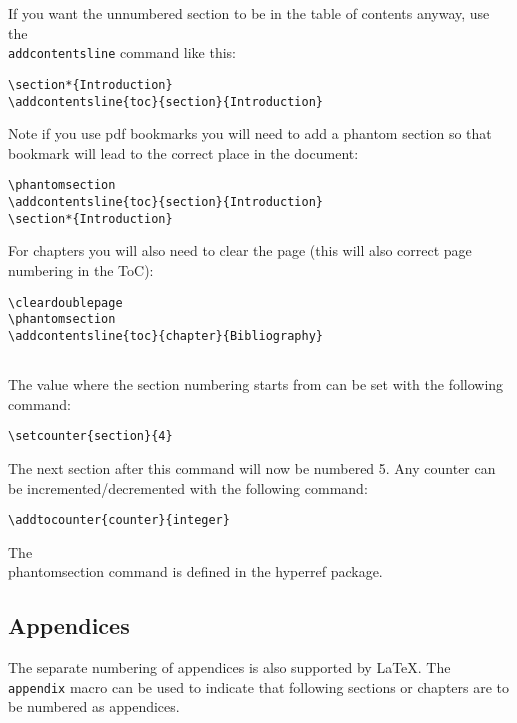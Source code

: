 If you want the unnumbered section to be in the table of contents anyway, use
the \texttt{\\addcontentsline} command like this:
\begin{lstlisting}
\section*{Introduction}
\addcontentsline{toc}{section}{Introduction}
\end{lstlisting}

Note if you use pdf bookmarks you will need to add a phantom section so that
bookmark will lead to the correct place in the document:
\begin{lstlisting}
\phantomsection
\addcontentsline{toc}{section}{Introduction}
\section*{Introduction} 
\end{lstlisting}

For chapters you will also need to clear the page (this will also correct page
numbering in the ToC):
\begin{lstlisting}
\cleardoublepage
\phantomsection
\addcontentsline{toc}{chapter}{Bibliography}


\end{lstlisting}

The value where the section numbering starts from can be set with the following
command:
\begin{lstlisting}
\setcounter{section}{4}
\end{lstlisting}

The next section after this command will now be numbered 5.  Any counter can be
incremented/decremented with the following command:
\begin{lstlisting}
\addtocounter{counter}{integer}
\end{lstlisting}

The \\phantomsection command is defined in the hyperref package.

\subsection{ Appendices }
The separate numbering of appendices is also supported by LaTeX. The
\texttt{\\appendix} macro can be used to indicate that following sections or
chapters are to be numbered as appendices.

